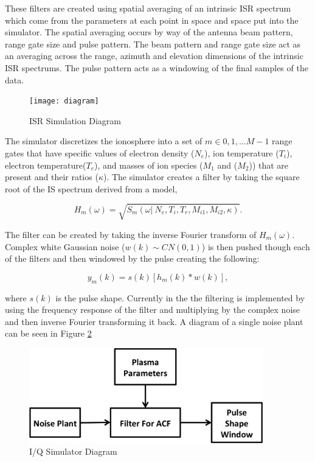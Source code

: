 \documentclass[10pt]{report}
\begin{document}
These filters are created using spatial averaging of an intrinsic ISR spectrum which come from the parameters at each point in space and space put into the simulator. The spatial averaging occurs by way of the antenna beam pattern, range gate size and pulse pattern. The beam pattern and range gate size act as an averaging across the range, azimuth and elevation dimensions of the intrinsic ISR spectrums. The pulse pattern acts as a windowing of the final samples of the data.

\begin{figure}[!h]
\centering
\texttt{[image: diagram]}
\caption{ISR Simulation Diagram}
\label{fig:isrdiag}
\end{figure}




The simulator discretizes the ionosphere into a set of $m\in 0,1,...M-1$ range gates that have specific values of electron density ($N_e$), ion temperature ($T_i$), electron temperature($T_e$), and masses of ion species ($M_1$ and ($M_2$)) that are present and their ratios ($\kappa$).  The simulator creates a filter by taking the square root of the IS spectrum derived from a model,

\begin{equation}
\label{eq1}
H_m(\omega) = \sqrt{S_m(\omega | \: N_e, T_i,  T_r, M_{i1}, M_{i2},\kappa)}.
\end{equation}

\noindent The filter can be created by taking the inverse Fourier transform of $H_m(\omega)$.  Complex white Gaussian noise  ($w(k)\sim CN(0,1)$) is then pushed though each of the filters and then windowed by the pulse creating the following:   

\begin{equation}
\label{eq2}
y_m (k)= s(k)\left[h_m(k)*w(k)\right],
\end{equation}
 
\noindent where $s(k)$ is the pulse shape.  Currently in the the filtering is implemented by using the frequency response of the filter and multiplying by the complex noise and then inverse Fourier transforming it back.  A diagram of a single noise plant can be seen in Figure \ref{fig:singlefilt}

\begin{figure}[!t]
\centering
\includegraphics[width=4in]{diagrampart}
\caption{I/Q Simulator Diagram}
\label{fig:singlefilt}
\end{figure}
\end{document}
